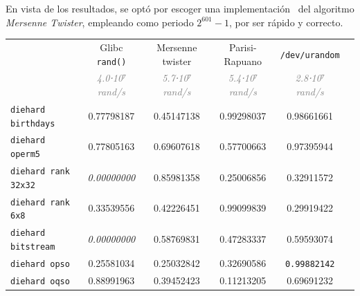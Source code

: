 \documentclass[11pt]{report}
\begin{document}
\begin{appendices}
En vista de los resultados, se optó por escoger una
implementación~\cite{sfmt} del algoritmo \textit{Mersenne Twister},
empleando como periodo $2^{601}-1$, por ser rápido y correcto.

\begin{center}
  \begin{tabular}{lccccc}
    \toprule
                                & Glibc \verb|rand()|                       & Mersenne twister                          & Parisi-Rapuano                            & \verb|/dev/urandom|                       \\
                                & \textcolor{gray}{\slshape 4.0⋅10⁷ rand/s} & \textcolor{gray}{\slshape 5.7⋅10⁷ rand/s} & \textcolor{gray}{\slshape 5.4⋅10⁷ rand/s} & \textcolor{gray}{\slshape 2.8⋅10⁷ rand/s} \\ \cmidrule(l){2-5}
    \verb|diehard birthdays|    & \textcolor{PASSED}{0.77798187}            & \textcolor{PASSED}{0.45147138}            & \textcolor{PASSED}{0.99298037}            & \textcolor{PASSED}{0.98661661}            \\
    \verb|diehard operm5|       & \textcolor{PASSED}{0.77805163}            & \textcolor{PASSED}{0.69607618}            & \textcolor{PASSED}{0.57700663}            & \textcolor{PASSED}{0.97395944}            \\
    \verb|diehard rank 32x32|   & \textit{\textcolor{FAILED}{0.00000000}}   & \textcolor{PASSED}{0.85981358}            & \textcolor{PASSED}{0.25006856}            & \textcolor{PASSED}{0.32911572}            \\
    \verb|diehard rank 6x8|     & \textcolor{PASSED}{0.33539556}            & \textcolor{PASSED}{0.42226451}            & \textcolor{PASSED}{0.99099839}            & \textcolor{PASSED}{0.29919422}            \\
    \verb|diehard bitstream|    & \textit{\textcolor{FAILED}{0.00000000}}   & \textcolor{PASSED}{0.58769831}            & \textcolor{PASSED}{0.47283337}            & \textcolor{PASSED}{0.59593074}            \\
    \verb|diehard opso|         & \textcolor{PASSED}{0.25581034}            & \textcolor{PASSED}{0.25032842}            & \textcolor{PASSED}{0.32690586}            & \texttt{\textcolor{WEAK}{0.99882142}}              \\
    \verb|diehard oqso|         & \textcolor{PASSED}{0.88991963}            & \textcolor{PASSED}{0.39452423}            & \textcolor{PASSED}{0.11213205}            & \textcolor{PASSED}{0.69691232}            \\

\end{tabular}
\end{center}
\end{appendices}
\end{document}
